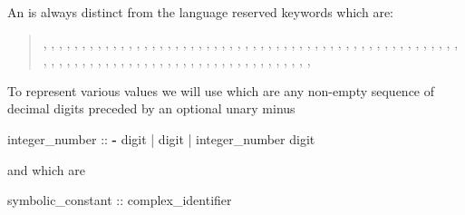 %
An  is always distinct from the \nusmv language
reserved keywords which are: \label{list of reserved keywords}\\
\begin{quote}
%
, , ,
,
, , , ,
, ,
, , , ,
, ,
, , ,
,
, , ,
, , , ,
, , , ,
, , ,
, , , ,
, ,
,
, , , ,
, , , , ,
, ,
,
, , , ,
, , , , ,
, , , , ,
, , , ,
, , , ,
, , , ,
, , , ,
, , , ,
, , 
\end{quote}

To represent various values we will use 
which are any non-empty sequence of decimal digits preceded by an
optional unary minus

\begin{Grammar}
integer_number ::
        \textbf{-} digit
      | digit
      | integer_number digit
\end{Grammar}

\noindent and  which are 

\begin{Grammar}
  symbolic_constant :: complex_identifier
\end{Grammar}

